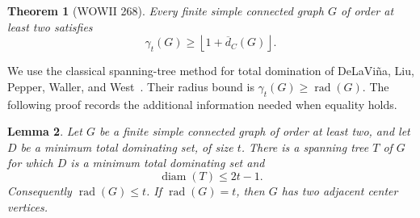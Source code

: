 \documentclass[11pt,a4paper]{article}
\newtheorem{theorem}{Theorem}[section]
\newtheorem{lemma}[theorem]{Lemma}
\theoremstyle{remark}
\begin{document}
\begin{theorem}[WOWII 268]
\label{r4:thm268}
Every finite simple connected graph $G$ of order at least two satisfies
\begin{equation}
 \label{r4:268bound}
 \gamma_t(G)\ge
 \left\lfloor 1+\overline d_C(G)\right\rfloor.
\end{equation}
\end{theorem}

We use the classical spanning-tree method for total domination
of DeLaVi\~na, Liu, Pepper, Waller, and West~\cite{DLPWW2007}.
Their radius bound is $\gamma_t(G)\ge\operatorname{rad}(G)$.
The following proof records the additional information needed when
equality holds.

\begin{lemma}
\label{r4:tdtree}
Let $G$ be a finite simple connected graph of order at least two, and let
$D$ be a minimum total dominating set, of size $t$.
There is a spanning tree $T$ of $G$ for which $D$ is a minimum total
dominating set and
\begin{equation}
 \label{r4:tdtreediameter}
 \operatorname{diam}(T)\le 2t-1.
\end{equation}
Consequently $\operatorname{rad}(G)\le t$.
If $\operatorname{rad}(G)=t$, then $G$ has two adjacent center vertices.
\end{lemma}
\end{document}
